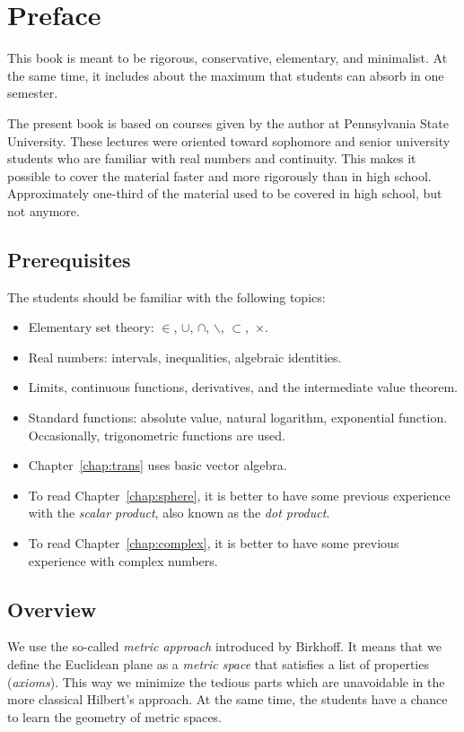 \chapter*{Preface}

This book is meant to be 
rigorous, 
conservative, 
elementary, 
and minimalist.
At the same time, it includes about the maximum that students can absorb in one semester.

The present book is based 
on courses given by the author 
at Pennsylvania State University.
These lectures were oriented toward sophomore and senior university students who are familiar with real numbers and continuity.
This makes it possible to cover the material faster and more rigorously than in high school.
Approximately one-third of the material used to be covered in high school, but not anymore.

\section{Prerequisites}

The students should be familiar 
with the following topics:
\begin{itemize}
\item Elementary set theory: 
$\in$,
$\cup$, 
$\cap$,
$\backslash$,
$\subset$,~$\times$.
\item Real numbers: intervals, inequalities, algebraic identities.
\item Limits, continuous functions, derivatives, and the intermediate value theorem.
\item Standard functions: 
absolute value, 
natural logarithm,
exponential function. 
Occasionally, trigonometric functions  are used.
\item  Chapter~\ref{chap:trans} uses basic vector algebra.
\item To read Chapter~\ref{chap:sphere}, it is better to have some previous experience with the \textit{scalar product}, also known as the \textit{dot product}.
\item To read Chapter~\ref{chap:complex}, it is better to have some previous experience with complex numbers.
\end{itemize} 

\section{Overview}

We use the so-called \textit{metric approach} introduced by Birkhoff.
It means that we define the Euclidean plane as a \textit{metric space} that satisfies a list of properties (\textit{axioms}).
This way we minimize the tedious parts
which are unavoidable in the more classical Hilbert's approach.
At the same time, the students have a chance to learn the geometry of metric spaces.


